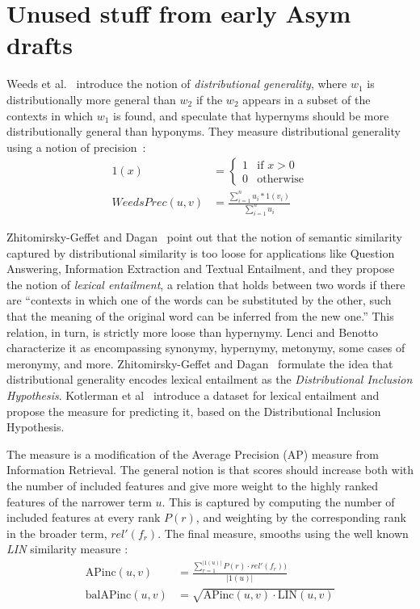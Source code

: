 \section{Unused stuff from early Asym drafts}

Weeds et al.~ introduce the
notion of \emph{distributional generality}, where $w_1$ is
distributionally more general than $w_2$ if the $w_2$ appears in a
subset of the contexts in which $w_1$ is found, and speculate that hypernyms should be more distributionally
general than hyponyms.
They measure distributional generality using a
notion of precision~\cite{WeedsWeir:2003:EMNLP}:
\begin{align*}
  1(x) & = \begin{cases}1 & \mbox{if } x > 0\\
    0 & \mbox{otherwise}
  \end{cases}\\
  WeedsPrec(u, v) & = \frac{\sum_{i=1}^n u_i * 1(v_i)}{\sum_{i=1}^n u_i}
\end{align*}

Zhitomirsky-Geffet and
Dagan~ point out that the
notion of semantic similarity captured by distributional similarity is
too loose for applications like Question Answering, Information
Extraction and Textual Entailment, and they propose the notion of \emph{lexical entailment}, a relation that holds between two
words if there are ``contexts in which one
of the words can be substituted by the other, such that the meaning of
the original word can be inferred from the new one.'' This relation,
in turn, is strictly more loose than hypernymy. Lenci and
Benotto~ characterize it as encompassing
synonymy, hypernymy, metonymy, some cases of meronymy, and
more. 
Zhitomirsky-Geffet and
Dagan~ formulate the idea
that distributional generality encodes lexical entailment as
the \emph{Distributional Inclusion Hypothesis}. Kotlerman et
al~ introduce a dataset for lexical
entailment and propose the {\balAPinc} measure for predicting
it, based on the Distributional Inclusion Hypothesis. 

The {\balAPinc} measure is a modification of the Average Precision (AP) measure
from Information Retrieval. The general notion is that scores should increase
both with the number of included features and give more weight to the highly
ranked features of the narrower term $u$. This is captured by computing the
number of included features at every rank $P(r)$, and weighting by the
corresponding rank in the broader term, $rel'(f_r)$. The final measure, {\balAPinc}
smooths using the well known {\em LIN} similarity measure \cite{lin1998information}:
\begin{align*}
  \mbox{APinc}(u, v) & = \frac{\sum_{r=1}^{|1(u)|}P(r)\cdot rel'(f_r))}{|1(u)|}\\
  \mbox{balAPinc}(u, v)  & = \sqrt{\mbox{APinc}(u, v)\cdot \mbox{LIN}(u, v)}
\end{align*}

